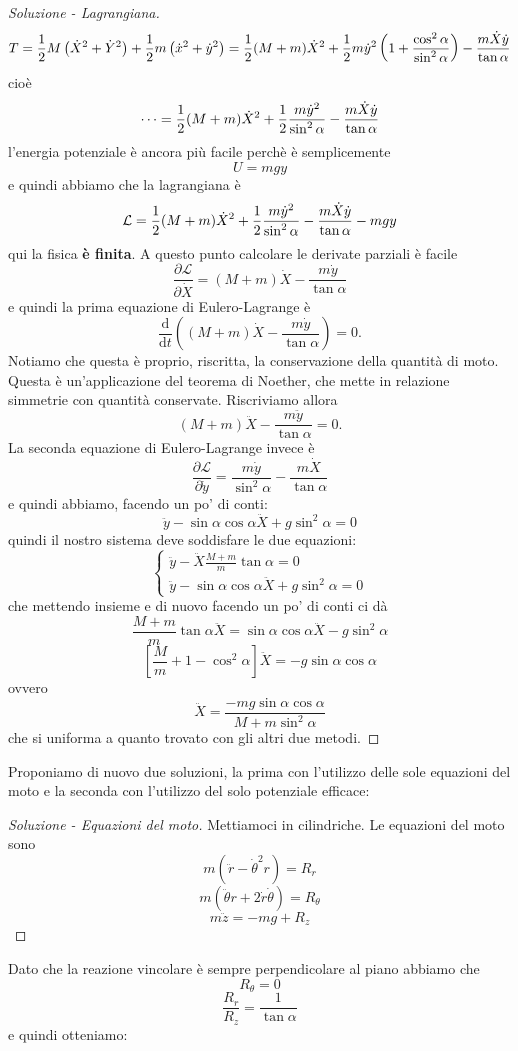 \documentclass[11pt]{scrartcl}
\newcommand{\dif}{\text{d}}
\begin{document}
\begin{sol}
\begin{proof}[Soluzione - Lagrangiana]
			$$T=\frac{1}{2} M\left(\dot{X}^2+\dot{Y}^2\right)+\frac{1}{2} m\left(\dot{x}^2+\dot{y}^2\right)=\frac{1}{2} (M+m)\dot{X}^2+\frac{1}{2} m\dot{y}^2\left(1+\frac{\cos^2\alpha}{\sin^2\alpha}\right)-\frac{m\dot{X}\dot{y}}{\tan\alpha}$$
			cioè
			$$\dots=\frac{1}{2} (M+m)\dot{X}^2+\frac{1}{2} \frac{m\dot{y}^2}{\sin^2\alpha}-\frac{m\dot{X}\dot{y}}{\tan\alpha}$$
			l'energia potenziale è ancora più facile perchè è semplicemente
			$$U=mgy$$
			e quindi abbiamo che la lagrangiana è
			$$\mathcal{L}=\frac{1}{2} (M+m)\dot{X}^2+\frac{1}{2} \frac{m\dot{y}^2}{\sin^2\alpha}-\frac{m\dot{X}\dot{y}}{\tan\alpha}-mgy$$
			qui la fisica \textbf{è finita}. A questo punto calcolare le derivate parziali è facile
			$$\frac{\partial\mathcal{L}}{\partial \dot{X}}=\left(M+m\right)\dot{X}-\frac{m\dot{y}}{\tan \alpha}$$
			e quindi la prima equazione di Eulero-Lagrange è
			$$\frac{\dif }{\dif t}\left(\left(M+m\right)\dot{X}-\frac{m\dot{y}}{\tan \alpha}\right)=0.$$
			Notiamo che questa è proprio, riscritta, la conservazione della quantità di moto. Questa è un'applicazione del teorema di Noether, che mette in relazione simmetrie con quantità conservate. Riscriviamo allora
			$$\left(M+m\right)\ddot{X}-\frac{m\ddot{y}}{\tan \alpha}=0.$$
			La seconda equazione di Eulero-Lagrange invece è
			$$\frac{\partial\mathcal{L}}{\partial \dot{y}}=\frac{m\dot{y}}{\sin^2\alpha}-\frac{m\dot{X}}{\tan\alpha}$$
			e quindi abbiamo, facendo un po' di conti:
			$$\ddot{y}-\sin\alpha\cos\alpha \ddot{X}+g\sin^2\alpha=0$$
			quindi il nostro sistema deve soddisfare le due equazioni:
			$$
			\begin{cases}
				\ddot{y}-\ddot{X}\frac{M+m}{m}\tan\alpha=0 \\
				\ddot{y}-\sin\alpha\cos\alpha \ddot{X}+g\sin^2\alpha=0
			\end{cases}
			$$
			che mettendo insieme e di nuovo facendo un po' di conti ci dà
			$$\frac{M+m}{m}\tan\alpha\ddot{X}=\sin\alpha\cos\alpha \ddot{X}-g\sin^2\alpha$$
			$$\left[\frac{M}{m}+1-\cos^2\alpha\right]\ddot{X}=-g\sin\alpha\cos\alpha$$
			ovvero
			$$\ddot{X}=\frac{-mg \sin\alpha\cos\alpha}{M+m\sin^2\alpha}$$
			che si uniforma a quanto trovato con gli altri due metodi.
		\end{proof}
	\end{sol}
	\begin{sol}
		Proponiamo di nuovo due soluzioni, la prima con l'utilizzo delle sole equazioni del moto e la seconda con l'utilizzo del solo potenziale efficace:
		\begin{proof}[Soluzione - Equazioni del moto]
			Mettiamoci in cilindriche. Le equazioni del moto sono
			$$m\left(\ddot{r}-\dot{\theta}^2r\right)=R_r$$
			$$m\left(\ddot{\theta}r+2\dot{r}\dot{\theta}\right)=R_{\theta}$$
			$$m\ddot{z}=-mg+R_z$$
		\end{proof}
		Dato che la reazione vincolare è sempre perpendicolare al piano abbiamo che $$R_\theta=0$$
		$$\frac{R_r}{R_z}=\frac{1}{\tan\alpha}$$
		e quindi otteniamo:
	\end{sol}
\end{document}
